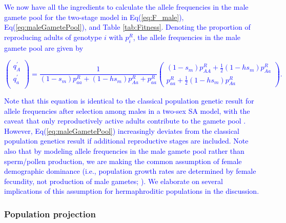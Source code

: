 \documentclass[11pt]{article}
\begin{document}
\textcolor{blue}{ We now have all the ingredients to calculate the allele frequencies in the male gamete pool for the two-stage model in Eq(\ref{eq:F_male}), Eq(\ref{eq:maleGametePool}), and Table \ref{tab:Fitness}. Denoting the proportion of reproducing adults of genotype $i$ with $p^R_i$, the allele frequencies in the male gamete pool are given by 
\begin{linenomath*}
\begin{equation} \label{eq:maleGametePool_example}
\left(
		\begin{array}{c}
			q^{\prime}_{A} \\
			q^{\prime}_{a} \\
		\end{array} \right) = 
				\frac{1}{(1-s_m)p^R_{aa}+ (1-hs_m)p^R_{Aa}+p^R_{aa}}\left(
		\begin{array}{c}
(1-s_m)p^R_{AA}	+\frac{1}{2}(1-hs_m)p^R_{Aa}\\
p^R_{aa}+\frac{1}{2}(1-hs_m)p^R_{Aa}
		\end{array} \right).
\end{equation}
\end{linenomath*}
Note that this equation is identical to the classical population genetic result for allele frequencies after selection among males in a two-sex SA model, with the caveat that only reproductively active adults contribute to the gamete pool \citep[e.g., see Eq(1a) of][]{Kidwell1977}. However, Eq(\ref{eq:maleGametePool}) increasingly deviates from the classical population genetics result if additional reproductive stages are included. Note also that by modeling allele frequencies in the male gamete pool rather than sperm/pollen production, we are making the common assumption of female demographic dominance (i.e., population growth rates are determined by female fecundity, not production of male gametes; \citealt{Caswell2001,iannelli2005gender,pollard1975mathematical}). We elaborate on several implications of this assumption for hermaphroditic populations in the discussion.}


\subsubsection*{Population projection}
\end{document}
